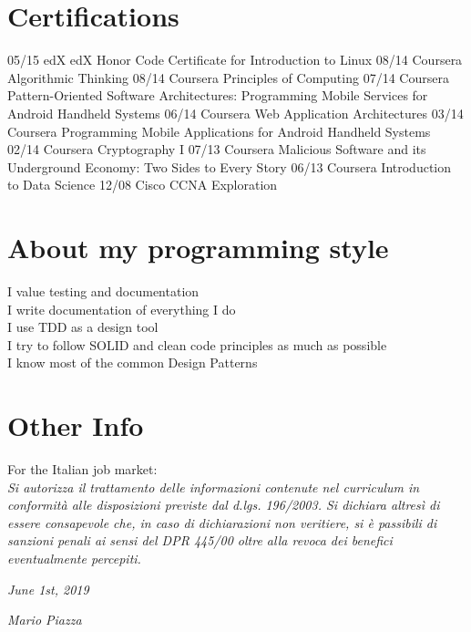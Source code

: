 \documentclass[]{friggeri-cv}
\begin{document}
\section{Certifications}
\begin{entrylist}
  \entry{}
    {05/15}
    {edX}
    {edX Honor Code Certificate for Introduction to Linux}
  \entry{}
    {08/14}
    {Coursera}
    {Algorithmic Thinking}
  \entry{}
    {08/14}
    {Coursera}
    {Principles of Computing}
  \entry{}
    {07/14}
    {Coursera}
    {Pattern-Oriented Software Architectures: Programming Mobile Services for Android Handheld Systems}
  \entry{}
    {06/14}
    {Coursera}
    {Web Application Architectures}
  \entry{}
    {03/14}
    {Coursera}
    {Programming Mobile Applications for Android Handheld Systems}
  \entry{}
    {02/14}
    {Coursera}
    {Cryptography I}
  \entry{}
    {07/13}
    {Coursera}
    {Malicious Software and its Underground Economy: Two Sides to Every Story}
  \entry{}
    {06/13}
    {Coursera}
    {Introduction to Data Science}
  \entry{}
    {12/08}
    {Cisco}
    {CCNA Exploration}
\end{entrylist}
\newpage
\section{About my programming style}
I value testing and documentation\\
I write documentation of everything I do\\
I use TDD as a design tool\\
I try to follow SOLID and clean code principles as much as possible\\
I know most of the common Design Patterns\\

\section{Other Info}
For the Italian job market:\\
\emph{Si autorizza il trattamento delle informazioni contenute nel curriculum in conformità alle disposizioni previste dal d.lgs. 196/2003. Si dichiara altresì di essere consapevole che, in caso di dichiarazioni non veritiere, si è passibili di sanzioni penali ai sensi del DPR 445/00 oltre alla revoca dei benefici eventualmente percepiti.}
\\
\begin{flushleft}
\emph{June 1st, 2019}
\end{flushleft}
\begin{flushright}
\emph{Mario Piazza}
\end{flushright}
\end{document}
